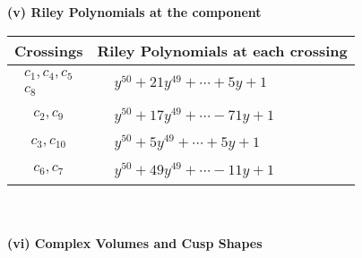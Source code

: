 \documentclass[1p]{elsarticle_modified}
\theoremstyle{definition}
\begin{document}
\newpage\renewcommand{\arraystretch}{1}
\flushleft \textbf{(v) Riley Polynomials at the component}\newline \\
\begin{tabular}{m{50pt}|m{274pt}}
Crossings & \hspace{64pt}Riley Polynomials at each crossing \\
\hline $$\begin{aligned}c_{1},c_{4},c_{5}\\c_{8}\end{aligned}$$&$\begin{aligned}
&y^{50}+21 y^{49}+\cdots+5 y+1
\end{aligned}$\\
\hline $$\begin{aligned}c_{2},c_{9}\end{aligned}$$&$\begin{aligned}
&y^{50}+17 y^{49}+\cdots-71 y+1
\end{aligned}$\\
\hline $$\begin{aligned}c_{3},c_{10}\end{aligned}$$&$\begin{aligned}
&y^{50}+5 y^{49}+\cdots+5 y+1
\end{aligned}$\\
\hline $$\begin{aligned}c_{6},c_{7}\end{aligned}$$&$\begin{aligned}
&y^{50}+49 y^{49}+\cdots-11 y+1
\end{aligned}$\\
\hline
\end{tabular}\\~\\
\newpage\flushleft \textbf{(vi) Complex Volumes and Cusp Shapes}
\end{document}
